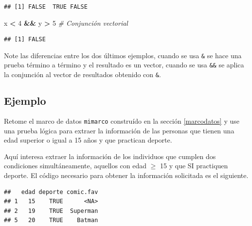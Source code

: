 \documentclass[10pt,]{krantz}
\makeatletter
\newenvironment{Shaded}{\begin{snugshade}}{\end{snugshade}}
\newcommand{\DecValTok}[1]{\textcolor[rgb]{0.00,0.00,0.81}{#1}}
\newcommand{\StringTok}[1]{\textcolor[rgb]{0.31,0.60,0.02}{#1}}
\newcommand{\CommentTok}[1]{\textcolor[rgb]{0.56,0.35,0.01}{\textit{#1}}}
\newcommand{\OtherTok}[1]{\textcolor[rgb]{0.56,0.35,0.01}{#1}}
\newcommand{\OperatorTok}[1]{\textcolor[rgb]{0.81,0.36,0.00}{\textbf{#1}}}
\newcommand{\NormalTok}[1]{#1}
\newenvironment{kframe}{%
\medskip{}
\setlength{\fboxsep}{.8em}
 \def\at@end@of@kframe{}%
 \ifinner\ifhmode%
  \def\at@end@of@kframe{\end{minipage}}%
  \begin{minipage}{\columnwidth}%
 \fi\fi%
 \def\FrameCommand##1{\hskip\@totalleftmargin \hskip-\fboxsep
 \colorbox{shadecolor}{##1}\hskip-\fboxsep
     \hskip-\linewidth \hskip-\@totalleftmargin \hskip\columnwidth}%
 \MakeFramed {\advance\hsize-\width
   \@totalleftmargin\z@ \linewidth\hsize
   \@setminipage}}%
 {\par\unskip\endMakeFramed%
 \at@end@of@kframe}
\renewenvironment{Shaded}{\begin{kframe}}{\end{kframe}}
\makeatother
\begin{document}
\begin{verbatim}
## [1] FALSE  TRUE FALSE
\end{verbatim}

\begin{Shaded}
\begin{Highlighting}[]
\NormalTok{x }\OperatorTok{<}\StringTok{ }\DecValTok{4} \OperatorTok{&&}\StringTok{ }\NormalTok{y }\OperatorTok{>}\StringTok{ }\DecValTok{5}  \CommentTok{# Conjunción vectorial}
\end{Highlighting}
\end{Shaded}

\begin{verbatim}
## [1] FALSE
\end{verbatim}

Note las diferencias entre los dos últimos ejemplos, cuando se usa
\texttt{\&} se hace una prueba término a término y el resultado es un
vector, cuando se usa \texttt{\&\&} se aplica la conjunción al vector de
resultados obtenido con \texttt{\&}.

\subsection*{Ejemplo}\label{ejemplo-8}


Retome el marco de datos \texttt{mimarco} construído en la sección
\ref{marcodatos} y use una prueba lógica para extraer la información de
las personas que tienen una edad superior o igual a 15 años y que
practican deporte.

Aquí interesa extraer la información de los individuos que cumplen dos
condiciones simultáneamente, aquellos con edad \(\geq\) 15 y que SI
practiquen deporte. El código necesario para obtener la información
solicitada es el siguiente.

\begin{Shaded}
\end{Shaded}

\begin{verbatim}
##   edad deporte comic.fav
## 1   15    TRUE      <NA>
## 2   19    TRUE  Superman
## 5   20    TRUE    Batman
\end{verbatim}
\end{document}
